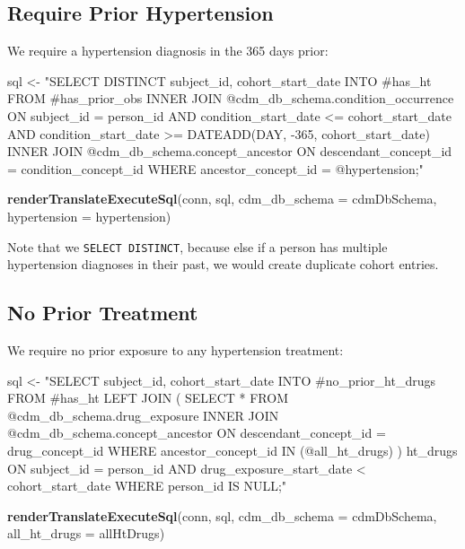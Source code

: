 \documentclass[11pt]{book}
\newenvironment{Shaded}{\begin{snugshade}}{\end{snugshade}}
\newcommand{\KeywordTok}[1]{\textcolor[rgb]{0.13,0.29,0.53}{\textbf{#1}}}
\newcommand{\DataTypeTok}[1]{\textcolor[rgb]{0.13,0.29,0.53}{#1}}
\newcommand{\StringTok}[1]{\textcolor[rgb]{0.31,0.60,0.02}{#1}}
\newcommand{\NormalTok}[1]{#1}
\theoremstyle{definition}
\theoremstyle{definition}
\theoremstyle{definition}
\theoremstyle{remark}
\begin{document}
\subsection{Require Prior
Hypertension}\label{require-prior-hypertension}

We require a hypertension diagnosis in the 365 days prior:

\begin{Shaded}
\begin{Highlighting}[]
\NormalTok{sql <-}\StringTok{ "SELECT DISTINCT subject_id,}
\StringTok{  cohort_start_date}
\StringTok{INTO #has_ht}
\StringTok{FROM #has_prior_obs}
\StringTok{INNER JOIN @cdm_db_schema.condition_occurrence}
\StringTok{  ON subject_id = person_id}
\StringTok{    AND condition_start_date <= cohort_start_date}
\StringTok{    AND condition_start_date >= DATEADD(DAY, -365, cohort_start_date)}
\StringTok{INNER JOIN @cdm_db_schema.concept_ancestor}
\StringTok{  ON descendant_concept_id = condition_concept_id}
\StringTok{WHERE ancestor_concept_id = @hypertension;"}

\KeywordTok{renderTranslateExecuteSql}\NormalTok{(conn, }
\NormalTok{                          sql, }
                          \DataTypeTok{cdm_db_schema =}\NormalTok{ cdmDbSchema, }
                          \DataTypeTok{hypertension =}\NormalTok{ hypertension)}
\end{Highlighting}
\end{Shaded}

Note that we \texttt{SELECT\ DISTINCT}, because else if a person has
multiple hypertension diagnoses in their past, we would create duplicate
cohort entries.

\subsection{No Prior Treatment}\label{no-prior-treatment}

We require no prior exposure to any hypertension treatment:

\begin{Shaded}
\begin{Highlighting}[]
\NormalTok{sql <-}\StringTok{ "SELECT subject_id,}
\StringTok{  cohort_start_date}
\StringTok{INTO #no_prior_ht_drugs}
\StringTok{FROM #has_ht}
\StringTok{LEFT JOIN (}
\StringTok{  SELECT *}
\StringTok{  FROM @cdm_db_schema.drug_exposure}
\StringTok{  INNER JOIN @cdm_db_schema.concept_ancestor}
\StringTok{    ON descendant_concept_id = drug_concept_id}
\StringTok{  WHERE ancestor_concept_id IN (@all_ht_drugs)}
\StringTok{) ht_drugs}
\StringTok{  ON subject_id = person_id}
\StringTok{    AND drug_exposure_start_date < cohort_start_date}
\StringTok{WHERE person_id IS NULL;"}

\KeywordTok{renderTranslateExecuteSql}\NormalTok{(conn, }
\NormalTok{                          sql, }
                          \DataTypeTok{cdm_db_schema =}\NormalTok{ cdmDbSchema, }
                          \DataTypeTok{all_ht_drugs =}\NormalTok{ allHtDrugs)}
\end{Highlighting}
\end{Shaded}
\end{document}
